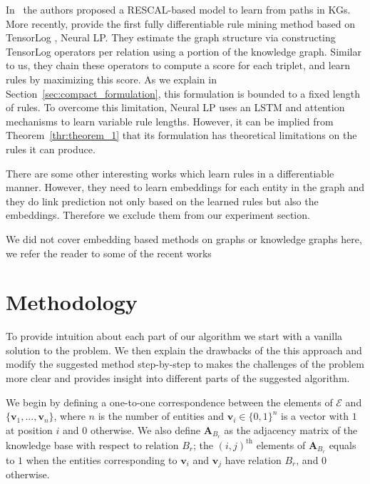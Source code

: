 \documentclass{article}
\newcommand{\mb}[1]{\mathbf{#1}}
\begin{document}
In~\cite{guu2015traversing} the authors proposed a RESCAL-based model to learn from paths in KGs. More recently, \citet{yang2017differentiable} provide the first fully differentiable rule mining method based on TensorLog \citep{cohen2016tensorlog}, Neural LP. They estimate the graph structure via constructing TensorLog operators per relation using a portion of the knowledge graph. Similar to us, they chain these operators to compute a score for each triplet, and learn rules by maximizing this score. As we explain in Section~\ref{sec:compact_formulation}, this formulation is bounded to a fixed length of rules. To overcome this limitation, Neural LP uses an LSTM and attention mechanisms to learn variable rule lengths. However, it can be implied from Theorem~\ref{thr:theorem_1} that its formulation has theoretical limitations on the rules it can produce.

There are some other interesting works \citep{das2017go, evans2018learning, minervini2018towards, rocktaschel2017end} which learn rules in a differentiable manner. However, they need to learn embeddings for each entity in the graph and they do link prediction not only based on the learned rules but also the embeddings. Therefore we exclude them from our experiment section. 

We did not cover embedding based methods on graphs or knowledge graphs here, we refer the reader to some of the recent works~\cite{hajiramezanali2019variational,hasanzadeh2019semi,kazemi2019relational,goyal2018graph} 

\section{Methodology}
\label{sec:methodology}

To provide intuition about each part of our algorithm we start with a vanilla solution to the problem. We then explain the drawbacks of the this approach and modify the suggested method step-by-step to makes the challenges of the problem more clear and provides insight into different parts of the suggested algorithm.

We begin by defining a one-to-one correspondence between the elements of $\mathcal{E}$ and $\{\mb{v}_1, ..., \mb{v}_n \}$, where $n$ is the number of entities and $\mb{v}_i \in \{0,1\}^n$ is a vector with $1$ at position $i$ and $0$ otherwise.  We also define $\mb{A}_{B_r}$ as the adjacency matrix of the knowledge base with respect to relation $B_r$; the $(i,j)^{\text{th}}$ elements of  $\mb{A}_{B_r}$ equals to $1$ when the entities corresponding to $\mb{v}_i$ and $\mb{v}_j$ have relation $B_r$, and $0$ otherwise.
\end{document}
